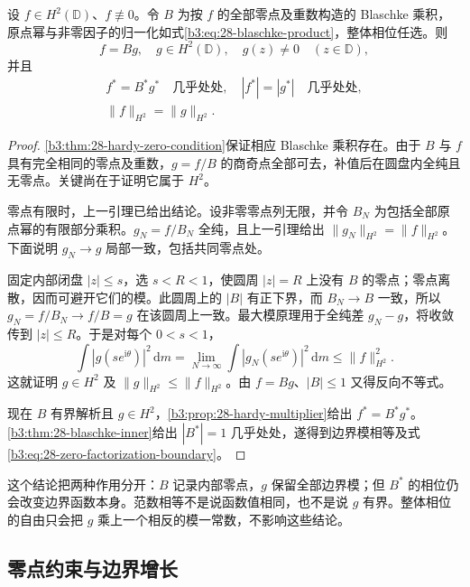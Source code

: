 \begin{theorem}\label{b3:thm:28-zero-factorization}
设 \(f\in H^2(\mathbb D)\)、\(f\not\equiv0\)。令 \(B\) 为按 \(f\) 的全部零点及重数构造的 Blaschke 乘积，原点幂与非零因子的归一化如式\eqref{b3:eq:28-blaschke-product}，整体相位任选。则
\[
 f=Bg,
 \quad g\in H^2(\mathbb D),
 \quad g(z)\ne0\quad(z\in\mathbb D),
\]
并且
\begin{equation}\label{b3:eq:28-zero-factorization-boundary}
 \begin{gathered}
 f^*=B^*g^*\quad\text{几乎处处},
 \quad |f^*|=|g^*|\quad\text{几乎处处},\\
 \|f\|_{H^2}=\|g\|_{H^2}.
 \end{gathered}
\end{equation}
\end{theorem}
\begin{proof}
\cref{b3:thm:28-hardy-zero-condition}保证相应 Blaschke 乘积存在。由于 \(B\) 与 \(f\) 具有完全相同的零点及重数，\(g=f/B\) 的商奇点全部可去，补值后在圆盘内全纯且无零点。关键尚在于证明它属于 \(H^2\)。

零点有限时，上一引理已给出结论。设非零零点列无限，并令 \(B_N\) 为包括全部原点幂的有限部分乘积。\(g_N=f/B_N\) 全纯，且上一引理给出 \(\|g_N\|_{H^2}=\|f\|_{H^2}\)。下面说明 \(g_N\to g\) 局部一致，包括共同零点处。

固定内部闭盘 \(|z|\le s\)，选 \(s<R<1\)，使圆周 \(|z|=R\) 上没有 \(B\) 的零点；零点离散，因而可避开它们的模。此圆周上的 \(|B|\) 有正下界，而 \(B_N\to B\) 一致，所以 \(g_N=f/B_N\to f/B=g\) 在该圆周上一致。最大模原理用于全纯差 \(g_N-g\)，将收敛传到 \(|z|\le R\)。于是对每个 \(0<s<1\)，
\[
 \int|g(se^{\mathrm i\theta})|^2\,\mathrm dm
 =\lim_{N\to\infty}\int|g_N(se^{\mathrm i\theta})|^2\,\mathrm dm
 \le\|f\|_{H^2}^2.
\]
这就证明 \(g\in H^2\) 及 \(\|g\|_{H^2}\le\|f\|_{H^2}\)。由 \(f=Bg\)、\(|B|\le1\) 又得反向不等式。

现在 \(B\) 有界解析且 \(g\in H^2\)，\cref{b3:prop:28-hardy-multiplier}给出 \(f^*=B^*g^*\)。\cref{b3:thm:28-blaschke-inner}给出 \(|B^*|=1\) 几乎处处，遂得到边界模相等及式\eqref{b3:eq:28-zero-factorization-boundary}。
\end{proof}

这个结论把两种作用分开：\(B\) 记录内部零点，\(g\) 保留全部边界模；但 \(B^*\) 的相位仍会改变边界函数本身。范数相等不是说函数值相同，也不是说 \(g\) 有界。整体相位的自由只会把 \(g\) 乘上一个相反的模一常数，不影响这些结论。

\subsection{零点约束与边界增长}
\label{b3:subsec:280304}

